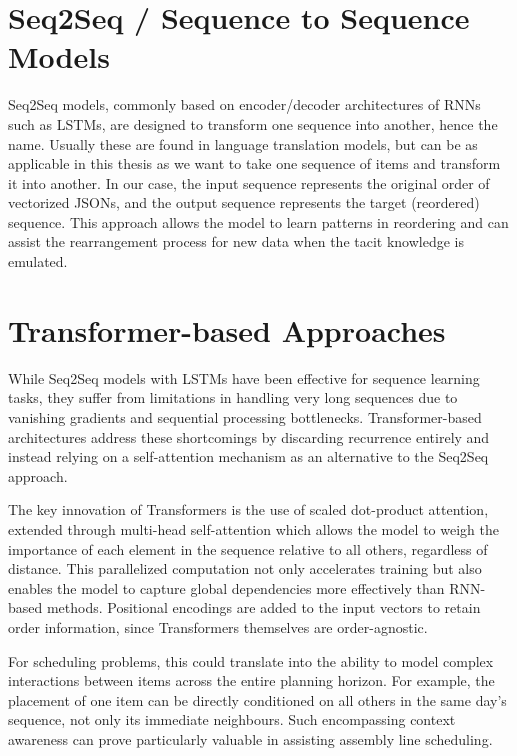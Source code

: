 \documentclass[12pt,a4paper]{report}
\begin{document}
\section{Seq2Seq / Sequence to Sequence Models}
Seq2Seq models, commonly based on encoder/decoder architectures of RNNs such as LSTMs, are designed to transform one sequence into another, hence the name. Usually these are found in language translation models, but can be as applicable in this thesis as we want to take one sequence of items and transform it into another. In our case, the input sequence represents the original order of vectorized JSONs, and the output sequence represents the target (reordered) sequence. \cite{ref2}\cite{ref3} This approach allows the model to learn patterns in reordering and can assist the rearrangement process for new data when the tacit knowledge is emulated. 

\section{Transformer-based Approaches}

While Seq2Seq models with LSTMs have been effective for sequence learning tasks, they suffer from limitations in handling very long sequences due to vanishing gradients and sequential processing bottlenecks. Transformer-based architectures address these shortcomings by discarding recurrence entirely and instead relying on a self-attention mechanism as an alternative to the Seq2Seq approach.

The key innovation of Transformers is the use of scaled dot-product attention, extended through multi-head self-attention which allows the model to weigh the importance of each element in the sequence relative to all others, regardless of distance. This parallelized computation not only accelerates training but also enables the model to capture global dependencies more effectively than RNN-based methods. Positional encodings are added to the input vectors to retain order information, since Transformers themselves are order-agnostic.\cite{ref5} 

For scheduling problems, this could translate into the ability to model complex interactions between items across the entire planning horizon. For example, the placement of one item can be directly conditioned on all others in the same day’s sequence, not only its immediate neighbours. Such encompassing context awareness can prove particularly valuable in assisting assembly line scheduling.
\end{document}
